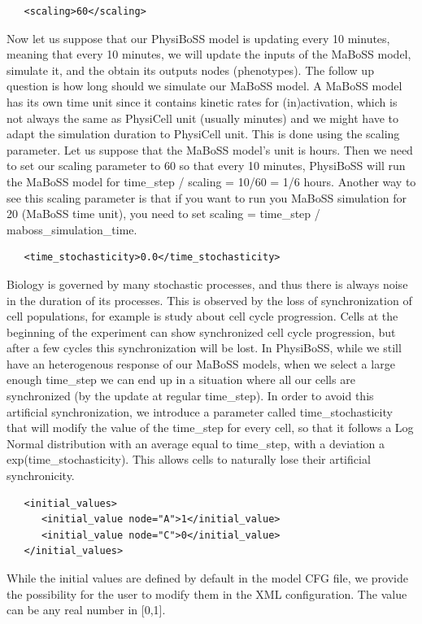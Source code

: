 \documentclass[12pt]{article}
\begin{document}
\begin{verbatim}
   <scaling>60</scaling>
\end{verbatim}
Now let us suppose that our PhysiBoSS model is updating every 10 minutes, meaning that every 10 minutes, we will update the inputs of the MaBoSS model, simulate it, and the obtain its outputs nodes (phenotypes). The follow up question is how long should we simulate our MaBoSS model. A MaBoSS model has its own time unit since it contains kinetic rates for (in)activation, which is not always the same as PhysiCell unit (usually minutes) and we might have to adapt the simulation duration to PhysiCell unit. This is done using the scaling parameter. Let us suppose that the MaBoSS model's unit is hours. Then we need to set our scaling parameter to 60 so that every 10 minutes, PhysiBoSS will run the MaBoSS model for time\_step / scaling = 10/60 = 1/6 hours. Another way to see this scaling parameter is that if you want to run you MaBoSS simulation for 20 (MaBoSS time unit), you need to set scaling = time\_step / maboss\_simulation\_time.  

\begin{verbatim}
   <time_stochasticity>0.0</time_stochasticity>
\end{verbatim}
Biology is governed by many stochastic processes, and thus there is always noise in the duration of its processes. This is observed by the loss of synchronization of cell populations, for example is study about cell cycle progression. Cells at the beginning of the experiment can show synchronized cell cycle progression, but after a few cycles this synchronization will be lost. In PhysiBoSS, while we still have an heterogenous response of our MaBoSS models, when we select a large enough time\_step we can end up in a situation where all our cells are synchronized (by the update at regular time\_step). In order to avoid this artificial synchronization, we introduce a parameter called time\_stochasticity that will modify the value of the time\_step for every cell, so that it follows a Log Normal distribution with an average equal to time\_step, with a deviation a exp(time\_stochasticity). This allows cells to naturally lose their artificial synchronicity.

\begin{verbatim}
   <initial_values>
      <initial_value node="A">1</initial_value>
      <initial_value node="C">0</initial_value>
   </initial_values>
\end{verbatim}

While the initial values are defined by default in the model CFG file, we provide the possibility for the user to modify them in the XML configuration. The value can be any real number in [0,1].
\end{document}
